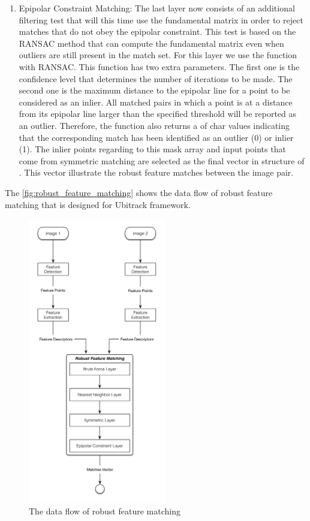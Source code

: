 \begin {enumerate}
  \item Epipolar Constraint Matching: The last layer now consists of an additional filtering test that will this time use the fundamental matrix in order to reject matches that do not obey the epipolar constraint. This test is based on the RANSAC method that can compute the fundamental matrix even when outliers are still present in the match set. For this layer we use the  function with RANSAC. This function has two extra parameters. The first one is the confidence level that determines the number of iterations to be made. The second one is the maximum distance to the epipolar line for a point to be considered as an inlier. All matched pairs in which a point is at a distance from its epipolar line larger than the specified threshold will be reported as an outlier. Therefore, the function also returns a  of char values indicating that the corresponding match has been identified as an outlier (0) or inlier (1). The inlier points regarding to this mask array and input points that come from symmetric matching are selected as the final vector in structure of . This vector illustrate the robust feature matches between the image pair.
\end {enumerate}

The \autoref{fig:robust_feature_matching} shows the data flow of robust feature matching that is designed for Ubitrack framework.
\begin{figure}[H]
  \centering
  \includegraphics[width=60mm]{figures/robust_feature_matching}
  \caption{The data flow of robust feature matching}\label{fig:robust_feature_matching}
\end{figure}

